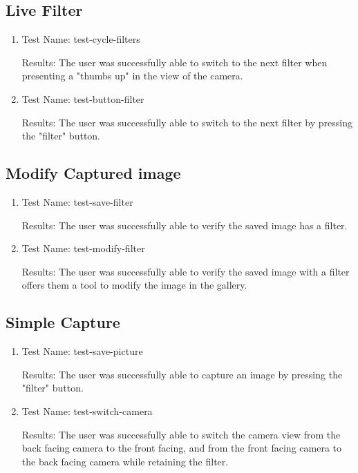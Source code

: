 \documentclass[12pt, titlepage]{article}
\begin{document}
\subsection{Live Filter}
\begin{enumerate}
    \item {Test Name: test-cycle-filters}
    
    Results: The user was successfully able to switch to the next filter when presenting a "thumbs up" in the view of the camera.\\
    
    \item {Test Name: test-button-filter}
    
    Results: The user was successfully able to switch to the next filter by pressing the "filter" button.\\
\end{enumerate}

\subsection{Modify Captured image}
\begin{enumerate}
    \item {Test Name: test-save-filter}
    
    Results: The user was successfully able to verify the saved image has a filter.\\
    
    \item{Test Name: test-modify-filter}
    
    Results: The user was successfully able to verify the saved image with a filter offers them a tool to modify the image in the gallery.\\
\end{enumerate}

\subsection{Simple Capture}
\begin{enumerate}
    \item {Test Name: test-save-picture}
    
    Results: The user was successfully able to capture an image by pressing the "filter" button.\\
    
    \item {Test Name: test-switch-camera}
    
    Results: The user was successfully able to switch the camera view from the back facing camera to the front facing, and from the front facing camera to the back facing camera while retaining the filter.\\
\end{enumerate}
\end{document}
